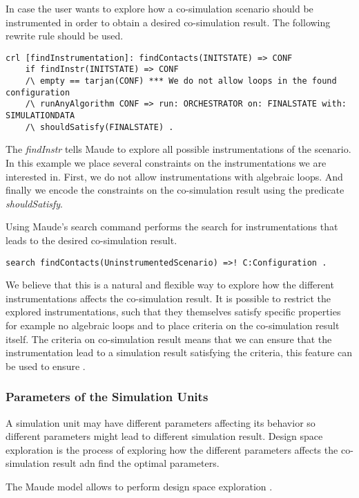 In case the user wants to explore how a co-simulation scenario should be instrumented in order to obtain a desired co-simulation result.
The following rewrite rule should be used. 
\begin{lstlisting}
crl [findInstrumentation]: findContacts(INITSTATE) => CONF
    if findInstr(INITSTATE) => CONF
    /\ empty == tarjan(CONF) *** We do not allow loops in the found configuration
    /\ runAnyAlgorithm CONF => run: ORCHESTRATOR on: FINALSTATE with: SIMULATIONDATA
    /\ shouldSatisfy(FINALSTATE) .
\end{lstlisting}

The \textit{findInstr} tells Maude to explore all possible instrumentations of the scenario. 
In this example we place several constraints on the instrumentations we are interested in.
First, we do not allow instrumentations with algebraic loops. 
And finally we encode the constraints on the co-simulation result using the predicate \textit{shouldSatisfy}.

Using Maude's search command performs the search for instrumentations that leads to the desired co-simulation result.

\begin{lstlisting}
search findContacts(UninstrumentedScenario) =>! C:Configuration .
\end{lstlisting}

We believe that this is a natural and flexible way to explore how the different instrumentations affects the co-simulation result.
It is possible to restrict the explored instrumentations, such that they themselves satisfy specific properties for example no algebraic loops and to place criteria on the co-simulation result itself. 
The criteria on co-simulation result means that we can ensure that the instrumentation lead to a simulation result satisfying the criteria, this feature can be used to ensure .

\subsubsection{Parameters of the Simulation Units}
A simulation unit may have different parameters affecting its behavior so different parameters might lead to different simulation result.
Design space exploration is the process of exploring how the different parameters affects the co-simulation result adn find the optimal parameters. 

The Maude model allows to perform design space exploration .

